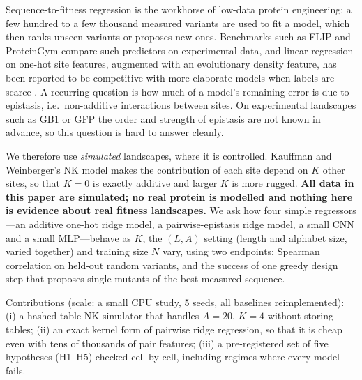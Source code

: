 Sequence-to-fitness regression is the workhorse of low-data protein engineering: a few hundred to a few thousand measured variants are used to fit a model, which then ranks unseen variants or proposes new ones. Benchmarks such as FLIP and ProteinGym \cite{dallago2021flip,notin2023proteingym} compare such predictors on experimental data, and linear regression on one-hot site features, augmented with an evolutionary density feature, has been reported to be competitive with more elaborate models when labels are scarce \cite{hsu2022learning}. A recurring question is how much of a model's remaining error is due to epistasis, i.e.\ non-additive interactions between sites. On experimental landscapes such as GB1 \cite{wu2016adaptation} or GFP \cite{sarkisyan2016local} the order and strength of epistasis are not known in advance, so this question is hard to answer cleanly.

We therefore use \emph{simulated} landscapes, where it is controlled. Kauffman and Weinberger's NK model \cite{kauffman1989nk} makes the contribution of each site depend on $K$ other sites, so that $K=0$ is exactly additive and larger $K$ is more rugged. \textbf{All data in this paper are simulated; no real protein is modelled and nothing here is evidence about real fitness landscapes.} We ask how four simple regressors---an additive one-hot ridge model, a pairwise-epistasis ridge model, a small CNN and a small MLP---behave as $K$, the $(L,A)$ setting (length and alphabet size, varied together) and training size $N$ vary, using two endpoints: Spearman correlation on held-out random variants, and the success of one greedy design step that proposes single mutants of the best measured sequence.

Contributions (scale: a small CPU study, 5 seeds, all baselines reimplemented): (i) a hashed-table NK simulator that handles $A=20$, $K=4$ without storing tables; (ii) an exact kernel form of pairwise ridge regression, so that it is cheap even with tens of thousands of pair features; (iii) a pre-registered set of five hypotheses (H1--H5) checked cell by cell, including regimes where every model fails.
